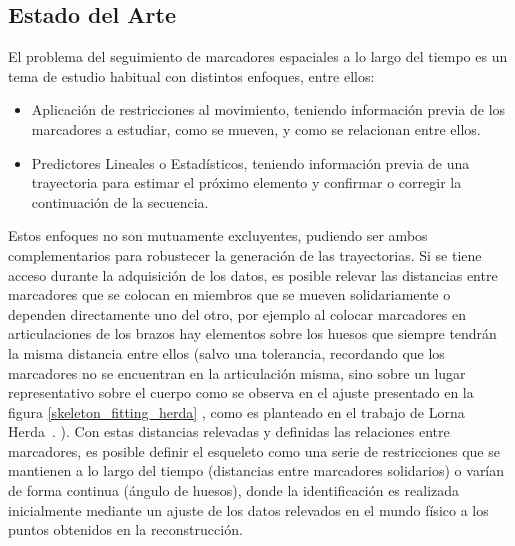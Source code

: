 \subsection{Estado del Arte}

El problema del seguimiento de marcadores espaciales a lo largo del tiempo es un tema de estudio habitual con distintos enfoques, entre ellos:

\begin{itemize}

\item Aplicación de restricciones al movimiento, teniendo información previa de los marcadores a estudiar, como se mueven, y como se relacionan entre ellos. 

\item Predictores Lineales o Estadísticos, teniendo información previa de una trayectoria para estimar el próximo elemento y confirmar o corregir la continuación de la secuencia.

\end{itemize}

Estos enfoques no son mutuamente excluyentes, pudiendo ser ambos complementarios para robustecer la generación de las trayectorias. Si se tiene acceso durante la adquisición de los datos, es posible relevar las distancias entre marcadores que se colocan en miembros que se mueven solidariamente  o dependen directamente uno del otro, por ejemplo al colocar marcadores en articulaciones de los brazos hay elementos sobre los huesos que siempre tendrán la misma distancia entre ellos (salvo una tolerancia, recordando que los marcadores no se encuentran en la articulación misma, sino sobre un lugar representativo sobre el cuerpo como se observa en el ajuste presentado en la figura \ref{skeleton_fitting_herda} , como es planteado en el trabajo de Lorna Herda~\cite{herda}. ). Con estas distancias relevadas y definidas las relaciones entre marcadores, es posible definir el esqueleto como una serie de restricciones que se mantienen a lo largo del tiempo (distancias entre marcadores solidarios) o varían de forma continua (ángulo de huesos), donde la identificación es realizada inicialmente mediante un ajuste de los datos relevados en el mundo físico a los puntos obtenidos en la reconstrucción. 

